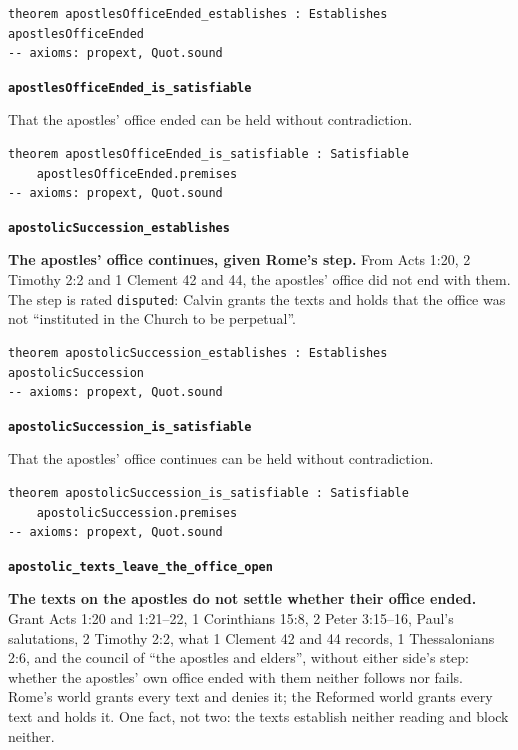 \documentclass[11pt]{article}
\begin{document}
{\small\begin{verbatim}
theorem apostlesOfficeEnded_establishes : Establishes apostlesOfficeEnded
-- axioms: propext, Quot.sound
\end{verbatim}}
\par\medskip\noindent\textbf{\texttt{apostles\allowbreak{}Office\allowbreak{}Ended\_\allowbreak{}is\_\allowbreak{}satisfiable}}\par\nobreak\noindent
That the apostles’ office ended can be held without contradiction.

{\small\begin{verbatim}
theorem apostlesOfficeEnded_is_satisfiable : Satisfiable
    apostlesOfficeEnded.premises
-- axioms: propext, Quot.sound
\end{verbatim}}
\par\medskip\noindent\textbf{\texttt{apostolic\allowbreak{}Succession\_\allowbreak{}establishes}}\par\nobreak\noindent
\textbf{The apostles’ office continues, given Rome’s step.} From Acts 1:20, 2 Timothy 2:2 and 1 Clement 42 and 44, the apostles’ office did not end with them. The step is rated \texttt{disputed}: Calvin grants the texts and holds that the office was not “instituted in the Church to be perpetual”.

{\small\begin{verbatim}
theorem apostolicSuccession_establishes : Establishes apostolicSuccession
-- axioms: propext, Quot.sound
\end{verbatim}}
\par\medskip\noindent\textbf{\texttt{apostolic\allowbreak{}Succession\_\allowbreak{}is\_\allowbreak{}satisfiable}}\par\nobreak\noindent
That the apostles’ office continues can be held without contradiction.

{\small\begin{verbatim}
theorem apostolicSuccession_is_satisfiable : Satisfiable
    apostolicSuccession.premises
-- axioms: propext, Quot.sound
\end{verbatim}}
\par\medskip\noindent\textbf{\texttt{apostolic\_\allowbreak{}texts\_\allowbreak{}leave\_\allowbreak{}the\_\allowbreak{}office\_\allowbreak{}open}}\par\nobreak\noindent
\textbf{The texts on the apostles do not settle whether their office ended.} Grant Acts 1:20 and 1:21–22, 1 Corinthians 15:8, 2 Peter 3:15–16, Paul’s salutations, 2 Timothy 2:2, what 1 Clement 42 and 44 records, 1 Thessalonians 2:6, and the council of “the apostles and elders”, without either side’s step: whether the apostles’ own office ended with them neither follows nor fails. Rome’s world grants every text and denies it; the Reformed world grants every text and holds it. One fact, not two: the texts establish neither reading and block neither.
\end{document}
